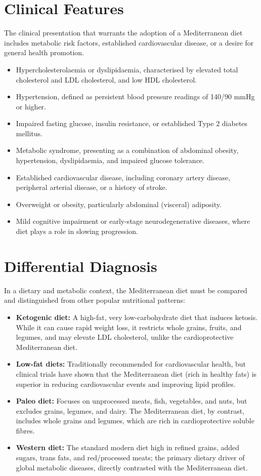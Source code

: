 \section*{Clinical Features}
The clinical presentation that warrants the adoption of a Mediterranean diet includes metabolic risk factors, established cardiovascular disease, or a desire for general health promotion.
\begin{itemize}
    \item Hypercholesterolaemia or dyslipidaemia, characterised by elevated total cholesterol and LDL cholesterol, and low HDL cholesterol.
    \item Hypertension, defined as persistent blood pressure readings of 140/90 mmHg or higher.
    \item Impaired fasting glucose, insulin resistance, or established Type 2 diabetes mellitus.
    \item Metabolic syndrome, presenting as a combination of abdominal obesity, hypertension, dyslipidaemia, and impaired glucose tolerance.
    \item Established cardiovascular disease, including coronary artery disease, peripheral arterial disease, or a history of stroke.
    \item Overweight or obesity, particularly abdominal (visceral) adiposity.
    \item Mild cognitive impairment or early-stage neurodegenerative diseases, where diet plays a role in slowing progression.
\end{itemize}

\section*{Differential Diagnosis}
In a dietary and metabolic context, the Mediterranean diet must be compared and distinguished from other popular nutritional patterns:
\begin{itemize}
    \item \textbf{Ketogenic diet:} A high-fat, very low-carbohydrate diet that induces ketosis. While it can cause rapid weight loss, it restricts whole grains, fruits, and legumes, and may elevate LDL cholesterol, unlike the cardioprotective Mediterranean diet.
    \item \textbf{Low-fat diets:} Traditionally recommended for cardiovascular health, but clinical trials have shown that the Mediterranean diet (rich in healthy fats) is superior in reducing cardiovascular events and improving lipid profiles.
    \item \textbf{Paleo diet:} Focuses on unprocessed meats, fish, vegetables, and nuts, but excludes grains, legumes, and dairy. The Mediterranean diet, by contrast, includes whole grains and legumes, which are rich in cardioprotective soluble fibres.
    \item \textbf{Western diet:} The standard modern diet high in refined grains, added sugars, trans fats, and red/processed meats; the primary dietary driver of global metabolic diseases, directly contrasted with the Mediterranean diet.
\end{itemize}

